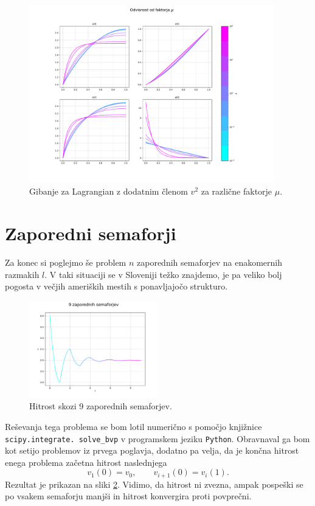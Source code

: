 \documentclass[a4paper, 12pt, slovene]{article}
\numberwithin{equation}{section}
\begin{document}
\begin{figure}[H]
\centering
\includegraphics[width=0.95\textwidth]{grafi/hitrostni_potencial.pdf}
\caption{Gibanje za Lagrangian z dodatnim členom $v^2$ za različne faktorje $\mu$.}
\label{f:hitrost-funkc}
\end{figure}



\section{Zaporedni semaforji}
Za konec si poglejmo še problem $n$ zaporednih semaforjev na enakomernih razmakih $l$. V taki situaciji se v Sloveniji težko znajdemo, je pa veliko bolj pogosta v večjih ameriških mestih s ponavljajočo strukturo. \par\vspace{5mm}

\begin{figure}[H]
\centering
\includegraphics[width=0.50\textwidth]{grafi/zaporedni_9.pdf}
\caption{Hitrost skozi 9 zaporednih semaforjev.}
\label{f:zaporedni-bad}
\end{figure}

Reševanja tega problema se bom lotil numerično s pomočjo knjižnice \texttt{scipy.integrate. solve_bvp} v programskem jeziku \texttt{Python}. Obravnaval ga bom kot setijo problemov iz prvega poglavja, dodatno pa velja, da je končna hitrost enega problema začetna hitrost naslednjega
\begin{equation}
v_1(0) = v_0, \qquad v_{i+1}(0) = v_i(1).
\end{equation}
Rezultat je prikazan na sliki \ref{f:zaporedni-bad}. Vidimo, da hitrost ni zvezna, ampak pospeški se po vsakem semaforju manjši in hitrost konvergira proti povprečni. \par\vspace{5mm}
\end{document}
